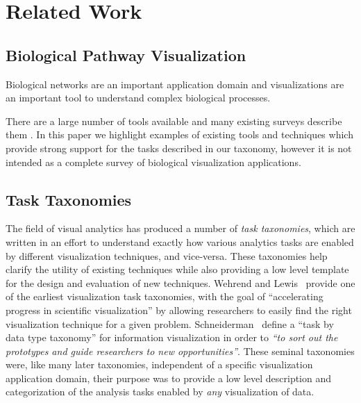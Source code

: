 \documentclass{egpubl}
\begin{document}
\section{Related Work}
\subsection{Biological Pathway Visualization}
Biological networks are an important application domain and visualizations are an important tool to understand complex biological processes.

There are a large number of tools available and many existing surveys describe them \cite{Suderman2007tools,pavlopoulos2008survey,Gehlenborg2010omics}.
In this paper we highlight examples of existing tools and techniques which provide strong support for the tasks described in our taxonomy, however it is not intended as a complete survey of biological visualization applications.




\subsection{Task Taxonomies}
The field of visual analytics has produced a number of \textit{task taxonomies}, which are written in an effort to understand exactly how various analytics tasks are enabled by different visualization techniques, and vice-versa.
These taxonomies help clarify the utility of existing techniques while also providing a low level template for the design and evaluation of new techniques.
Wehrend and Lewis~\cite{Wehrend1990} provide one of the earliest visualization task taxonomies, with the goal of ``accelerating progress in scientific visualization'' by allowing researchers to easily find the right visualization technique for a given problem.
Schneiderman~\cite{Shneiderman1996} define a ``task by data type taxonomy'' for information visualization in order to \textit{``to sort out the prototypes and guide researchers to new opportunities''}.
These seminal taxonomies were, like many later taxonomies, independent of a specific visualization application domain, their purpose was to provide a low level description and categorization of the analysis tasks enabled by \textit{any} visualization of data.
\end{document}
